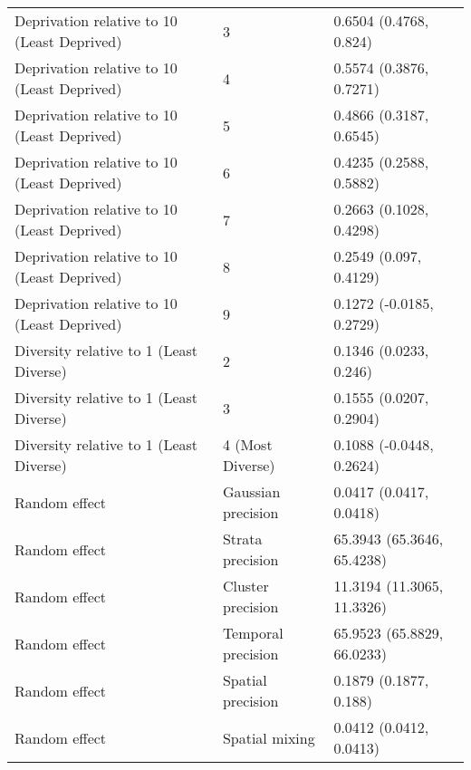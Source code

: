 \begin{table}[ht]
\begin{tabular}{lll}
  Deprivation relative to 10 (Least Deprived) & 3 & 0.6504 (0.4768, 0.824) \\ 
  Deprivation relative to 10 (Least Deprived) & 4 & 0.5574 (0.3876, 0.7271) \\ 
  Deprivation relative to 10 (Least Deprived) & 5 & 0.4866 (0.3187, 0.6545) \\ 
  Deprivation relative to 10 (Least Deprived) & 6 & 0.4235 (0.2588, 0.5882) \\ 
  Deprivation relative to 10 (Least Deprived) & 7 & 0.2663 (0.1028, 0.4298) \\ 
  Deprivation relative to 10 (Least Deprived) & 8 & 0.2549 (0.097, 0.4129) \\ 
  Deprivation relative to 10 (Least Deprived) & 9 & 0.1272 (-0.0185, 0.2729) \\ 
  Diversity relative to 1 (Least Diverse) & 2 & 0.1346 (0.0233, 0.246) \\ 
  Diversity relative to 1 (Least Diverse) & 3 & 0.1555 (0.0207, 0.2904) \\ 
  Diversity relative to 1 (Least Diverse) & 4 (Most Diverse) & 0.1088 (-0.0448, 0.2624) \\ 
  Random effect & Gaussian precision & 0.0417 (0.0417, 0.0418) \\ 
  Random effect & Strata precision & 65.3943 (65.3646, 65.4238) \\ 
  Random effect & Cluster precision & 11.3194 (11.3065, 11.3326) \\ 
  Random effect & Temporal precision & 65.9523 (65.8829, 66.0233) \\ 
  Random effect & Spatial precision & 0.1879 (0.1877, 0.188) \\ 
  Random effect & Spatial mixing & 0.0412 (0.0412, 0.0413) \\ 
   \hline
\end{tabular}
\end{table}
